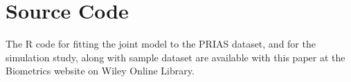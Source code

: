 \section{Source Code}
The R code for fitting the joint model to the PRIAS dataset, and for the simulation study, along with sample dataset are available with this paper at the Biometrics website on Wiley Online Library.